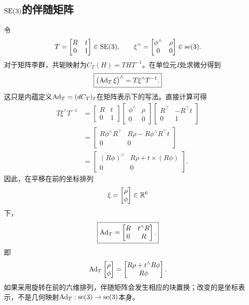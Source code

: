 \subsection{$\operatorname{SE}(3)$的伴随矩阵}

令
\[
    T=
    \begin{bmatrix}R&t\\0&1\end{bmatrix}\in\operatorname{SE}(3),
    \qquad
    \xi^\wedge=
    \begin{bmatrix}\phi^\wedge&\rho\\0&0\end{bmatrix}\in\operatorname{se}(3).
\]
对于矩阵李群，共轭映射为$C_T(H)=THT^{-1}$。在单位元$I$处求微分得到
\[
    \boxed{
    \bigl(\operatorname{Ad}_T\xi\bigr)^\wedge
    =T\xi^\wedge T^{-1}.
    }
\]
这只是内蕴定义$\operatorname{Ad}_T=(dC_T)_I$在矩阵表示下的写法。直接计算可得
\[
\begin{aligned}
    T\xi^\wedge T^{-1}
    &=
    \begin{bmatrix}R&t\\0&1\end{bmatrix}
    \begin{bmatrix}\phi^\wedge&\rho\\0&0\end{bmatrix}
    \begin{bmatrix}R^\top&-R^\top t\\0&1\end{bmatrix}\\
    &=
    \begin{bmatrix}
        R\phi^\wedge R^\top&
        R\rho-R\phi^\wedge R^\top t\\
        0&0
    \end{bmatrix}\\
    &=
    \begin{bmatrix}
        (R\phi)^\wedge&
        R\rho+t\times(R\phi)\\
        0&0
    \end{bmatrix}.
\end{aligned}
\]
因此，在平移在前的坐标排列
\[
    \xi=
    \begin{bmatrix}\rho\\\phi\end{bmatrix}\in\mathbb{R}^6
\]
下，
\[
    \boxed{
    \operatorname{Ad}_T
    =
    \begin{bmatrix}
        R&t^\wedge R\\
        0&R
    \end{bmatrix}.
    }
\]
即
\[
    \operatorname{Ad}_T
    \begin{bmatrix}\rho\\\phi\end{bmatrix}
    =
    \begin{bmatrix}
        R\rho+t^\wedge R\phi\\
        R\phi
    \end{bmatrix}.
\]
如果采用旋转在前的六维排列，伴随矩阵会发生相应的块置换；改变的是坐标表示，不是几何映射$\operatorname{Ad}_T:\operatorname{se}(3)\to\operatorname{se}(3)$本身。

